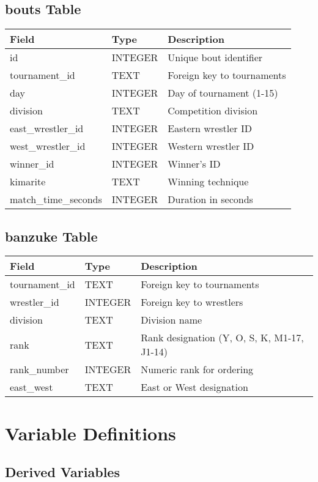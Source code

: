 \subsection{bouts Table}
\begin{longtable}{llp{7cm}}
\toprule
Field & Type & Description \\
\midrule
\endhead
id & INTEGER & Unique bout identifier \\
tournament\_id & TEXT & Foreign key to tournaments \\
day & INTEGER & Day of tournament (1-15) \\
division & TEXT & Competition division \\
east\_wrestler\_id & INTEGER & Eastern wrestler ID \\
west\_wrestler\_id & INTEGER & Western wrestler ID \\
winner\_id & INTEGER & Winner's ID \\
kimarite & TEXT & Winning technique \\
match\_time\_seconds & INTEGER & Duration in seconds \\
\bottomrule
\end{longtable}

\subsection{banzuke Table}
\begin{longtable}{llp{7cm}}
\toprule
Field & Type & Description \\
\midrule
\endhead
tournament\_id & TEXT & Foreign key to tournaments \\
wrestler\_id & INTEGER & Foreign key to wrestlers \\
division & TEXT & Division name \\
rank & TEXT & Rank designation (Y, O, S, K, M1-17, J1-14) \\
rank\_number & INTEGER & Numeric rank for ordering \\
east\_west & TEXT & East or West designation \\
\bottomrule
\end{longtable}

\section{Variable Definitions}

\subsection{Derived Variables}

